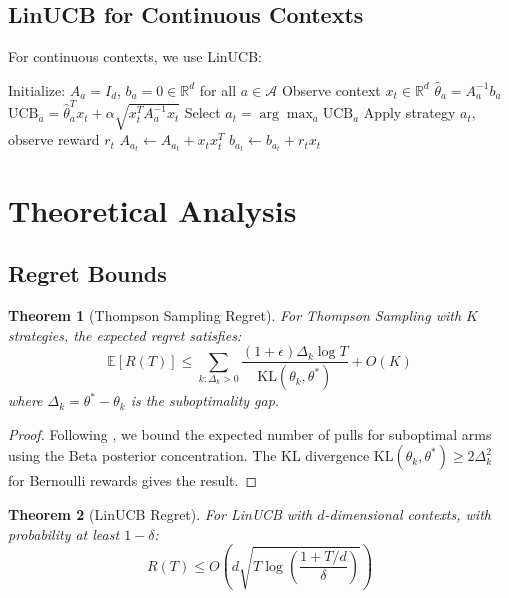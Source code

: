 \documentclass{article}
\theoremstyle{plain}
\newtheorem{theorem}{Theorem}
\theoremstyle{definition}
\begin{document}
\subsection{LinUCB for Continuous Contexts}

For continuous contexts, we use LinUCB:

\begin{algorithm}
\caption{LinUCB for Contextual Optimization}
\begin{algorithmic}
\STATE Initialize: $A_a = I_d$, $b_a = 0 \in \mathbb{R}^d$ for all $a \in \mathcal{A}$
    \STATE Observe context $x_t \in \mathbb{R}^d$
        \STATE $\hat{\theta}_a = A_a^{-1}b_a$
        \STATE $\text{UCB}_a = \hat{\theta}_a^T x_t + \alpha\sqrt{x_t^T A_a^{-1} x_t}$
    \ENDFOR
    \STATE Select $a_t = \arg\max_a \text{UCB}_a$
    \STATE Apply strategy $a_t$, observe reward $r_t$
    \STATE $A_{a_t} \leftarrow A_{a_t} + x_t x_t^T$
    \STATE $b_{a_t} \leftarrow b_{a_t} + r_t x_t$
\ENDFOR
\end{algorithmic}
\end{algorithm}

\section{Theoretical Analysis}

\subsection{Regret Bounds}

\begin{theorem}[Thompson Sampling Regret]
For Thompson Sampling with $K$ strategies, the expected regret satisfies:
\[
\mathbb{E}[R(T)] \leq \sum_{k: \Delta_k > 0} \frac{(1+\epsilon)\Delta_k \log T}{\text{KL}(\theta_k, \theta^*)} + O(K)
\]
where $\Delta_k = \theta^* - \theta_k$ is the suboptimality gap.
\end{theorem}

\begin{proof}
Following \cite{agrawal2012analysis}, we bound the expected number of pulls for suboptimal arms using the Beta posterior concentration. The KL divergence $\text{KL}(\theta_k, \theta^*) \geq 2\Delta_k^2$ for Bernoulli rewards gives the result.
\end{proof}

\begin{theorem}[LinUCB Regret]
For LinUCB with $d$-dimensional contexts, with probability at least $1-\delta$:
\[
R(T) \leq O\left(d\sqrt{T\log\left(\frac{1+T/d}{\delta}\right)}\right)
\]
\end{theorem}
\end{document}
